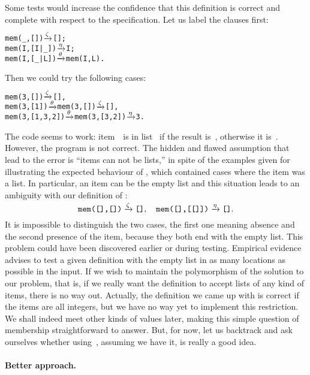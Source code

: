 Some tests would increase the confidence that this definition is
correct and complete with respect to the specification. Let us label
the clauses first:
\begin{alltt}
mem(_,   []) \(\smashedrightarrow{\zeta}\) [];
mem(I,[I|_]) \(\smashedrightarrow{\eta}\) I;
mem(I,[_|L]) \(\smashedrightarrow{\theta}\) mem(I,L).
\end{alltt}
Then we could try the following cases:
\begin{alltt}
     mem(3,[]) \(\smashedrightarrow{\zeta}\) []\textrm{,}
    mem(3,[1]) \(\smashedrightarrow{\theta}\) mem(3,[])    \(\smashedrightarrow{\zeta}\) []\textrm{,}
mem(3,[1,3,2]) \(\smashedrightarrow{\theta}\) mem(3,[3,2]) \(\smashedrightarrow{\eta}\) 3\textrm{.}
\end{alltt}
The code seems to work: item~~is in list~ if the
result is~, otherwise it is~\erlcode{[]}. However, the
program is not correct. The hidden and flawed assumption that lead to
the error is ``items can not be lists,'' in spite of the examples
given for illustrating the expected behaviour of ,
which contained cases where the item was a list. In particular, an
item can be the empty list and this situation leads to an ambiguity
with our definition of :
\[
\texttt{mem([],[])}   \xrightarrow{\smash{\zeta}} \texttt{[]},\quad
\texttt{mem([],[[]])} \xrightarrow{\smash{\eta}} \texttt{[]}.
\]
It is impossible to distinguish the two cases, the first one meaning
absence and the second presence of the item, because they both end
with the empty list. This problem could have been discovered earlier
or during testing. Empirical evidence advises to test a given
definition with the empty list in as many locations as possible in the
input. If we wish to maintain the polymorphism of the solution to our
problem, that is, if we really want the definition to accept lists of
any kind of items, there is no way out. Actually, the definition we
came up with is correct if the items are all integers, but we have no
way yet to implement this restriction. We shall indeed meet other
kinds of values later, making this simple question of membership
straightforward to answer. But, for now, let us backtrack and ask
ourselves whether using~, assuming we have it, is
really a good idea.

\medskip

\paragraph{Better approach.}

